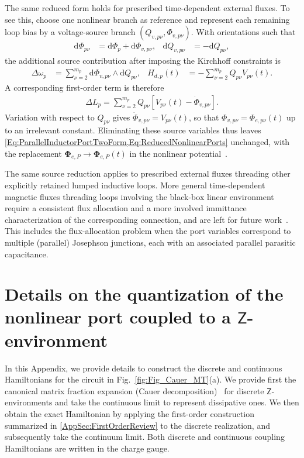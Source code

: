 \documentclass[prx,aps,twocolumn,article]{revtex4-2}
\newcommand{\msf}[1]{\mathsf{#1}}
\newcommand{\bsb}[1]{\boldsymbol{#1}}
\newcommand{\bPhi}{\bsb{\Phi}}
\newcommand{\msZ}{\msf{Z}}
\begin{document}
The same reduced form holds for prescribed time-dependent external
fluxes. To see this, choose one nonlinear branch as reference and represent
each remaining loop bias by a voltage-source branch
$(Q_{v,p\nu},\Phi_{v,p\nu})$. With orientations such that
\begin{align}
    \mathrm{d}\Phi_{p\nu}
    &=
    \mathrm{d}\Phi_p
    +
    \mathrm{d}\Phi_{v,p\nu},
    &
    \mathrm{d}Q_{v,p\nu}
    &=
    -\mathrm{d}Q_{p\nu},
\end{align}
the additional source contribution after imposing the Kirchhoff constraints is~\cite{ParraRodriguez:2024}
\begin{align}
    \Delta\omega_p
    &=
    \sum_{\nu=2}^{m_p}
    \mathrm{d}\Phi_{v,p\nu}
    \wedge
    \mathrm{d}Q_{p\nu},
    &
    H_{d,p}(t)
    &=
    -\sum_{\nu=2}^{m_p}
    Q_{p\nu}V_{p\nu}(t).
\end{align}
A corresponding first-order term is therefore
\begin{align}
    \Delta L_p
    =
    \sum_{\nu=2}^{m_p}
    Q_{p\nu}
    \left[
        V_{p\nu}(t)
        -
        \dot{\Phi}_{v,p\nu}
    \right].
\end{align}
Variation with respect to $Q_{p\nu}$ gives
$\dot{\Phi}_{v,p\nu}=V_{p\nu}(t)$, so that
$\Phi_{v,p\nu}=\Phi_{e,p\nu}(t)$ up to an irrelevant constant.
Eliminating these source variables thus leaves
\cref{Eq:ParallelInductorPortTwoForm,Eq:ReducedNonlinearPorts}
unchanged, with the replacement
$\bPhi_{e,P}\rightarrow\bPhi_{e,P}(t)$ in the nonlinear
potential~\cite{You:2019,ParraRodriguez:2024}. 

The same source reduction applies to prescribed external fluxes threading other explicitly retained lumped inductive loops. More general time-dependent magnetic fluxes threading loops involving the black-box linear environment require a consistent flux allocation and a more involved immittance characterization of the corresponding connection, and are left for future work~\cite{You:2019,Riwar:2022}. This includes the flux-allocation problem when the port variables correspond to multiple (parallel) Josephson junctions, each with an associated parallel parasitic capacitance.

\section{Details on the quantization of the nonlinear port coupled to a $\msZ$-environment}
\label{AppSec:Z_construction_and_quantization}

In this Appendix, we provide details to construct the discrete and continuous Hamiltonians for the circuit in Fig.~\ref{fig:Fig_Cauer_MT}(a). We provide first the canonical matrix fraction expansion (Cauer decomposition)~\cite{Newcomb:1966} for discrete $\msZ$-environments and take the continuous limit to represent dissipative ones. We then obtain the exact Hamiltonian by applying the first-order
construction~\cite{ParraRodriguez:2024,ParraRodriguez:2025} summarized in \cref{AppSec:FirstOrderReview} to the
discrete realization, and subsequently take the continuum limit.
Both discrete and continuous coupling Hamiltonians are written in the
charge gauge.
\end{document}
